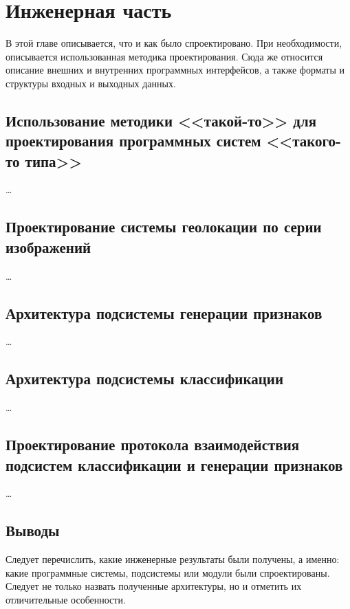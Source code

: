 \chapter{Инженерная часть}

В этой главе описывается, что и как было спроектировано. При необходимости, описывается использованная методика проектирования. Сюда же относится описание внешних и внутренних программных интерфейсов, а также форматы и структуры входных и выходных данных.


\section{Использование методики <<такой-то>> для проектирования программных систем <<такого-то типа>>}

\dots

\section{Проектирование системы геолокации по серии изображений}

\dots


\section{Архитектура подсистемы генерации признаков}

\dots


\section{Архитектура подсистемы классификации}

\dots


\section{
  Проектирование протокола взаимодействия подсистем 
  классификации и генерации признаков
}

\dots


\section{Выводы}

Следует перечислить, какие инженерные результаты были получены, а именно: 
какие программные системы, подсистемы или модули были спроектированы. Следует 
не только назвать полученные архитектуры, но и отметить их отличительные 
особенности.
